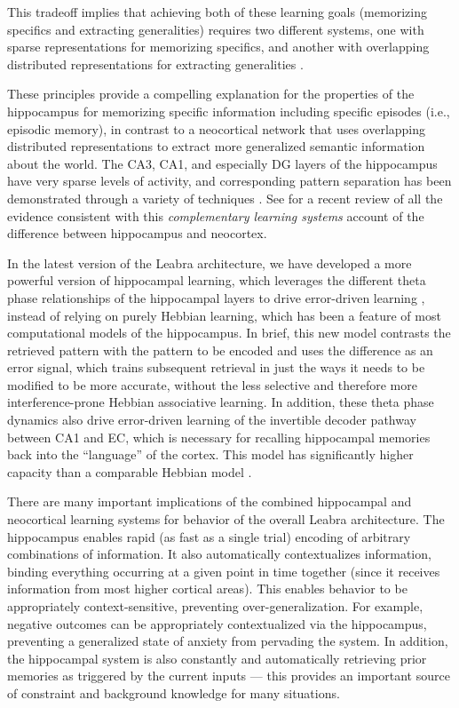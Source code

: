 \documentclass[11pt,twoside]{article}
\begin{document}
This tradeoff implies that achieving both of these learning goals (memorizing
specifics and extracting generalities) requires two different systems, one
with sparse representations for memorizing specifics, and another with
overlapping distributed representations for extracting generalities
\cite{McClellandMcNaughtonOReilly95,SherrySchacter87}.

These principles provide a compelling explanation for the properties of the
hippocampus for memorizing specific information including specific episodes
(i.e., episodic memory), in contrast to a neocortical network that uses
overlapping distributed representations to extract more generalized semantic
information about the world.  The CA3, CA1, and especially DG layers of the
hippocampus have very sparse levels of activity, and corresponding pattern
separation has been demonstrated through a variety of techniques
\cite{GilbertKesnerLee01,LeutgebLeutgebMoserEtAl07,McHughJonesQuinnEtAl07,BakkerKirwanMillerEtAl08}.  See 
for a recent review of all the evidence consistent with this {\em
  complementary learning systems} account of the difference between
hippocampus and neocortex.

In the latest version of the Leabra architecture, we have developed a more
powerful version of hippocampal learning, which leverages the different theta
phase relationships of the hippocampal layers to drive error-driven learning
\cite{KetzEtAlIP}, instead of relying on purely Hebbian learning, which
has been a feature of most computational models of the hippocampus.  In brief,
this new model contrasts the retrieved pattern with the pattern to be encoded
and uses the difference as an error signal, which trains subsequent retrieval
in just the ways it needs to be modified to be more accurate, without the less
selective and therefore more interference-prone Hebbian associative learning.
In addition, these theta phase dynamics also drive error-driven learning of
the invertible decoder pathway between CA1 and EC, which is necessary for
recalling hippocampal memories back into the ``language'' of the cortex.  This
model has significantly higher capacity than a comparable Hebbian model
\cite{KetzEtAlIP}.

There are many important implications of the combined hippocampal and
neocortical learning systems for behavior of the overall Leabra architecture.
The hippocampus enables rapid (as fast as a single trial) encoding of
arbitrary combinations of information.  It also automatically contextualizes
information, binding everything occurring at a given point in time together
(since it receives information from most higher cortical areas).  This enables
behavior to be appropriately context-sensitive, preventing
over-generalization.  For example, negative outcomes can be appropriately
contextualized via the hippocampus, preventing a generalized state of anxiety
from pervading the system.  In addition, the hippocampal system is also
constantly and automatically retrieving prior memories as triggered by the
current inputs --- this provides an important source of constraint and
background knowledge for many situations.
\end{document}
